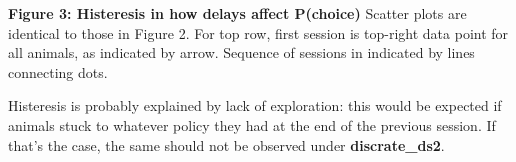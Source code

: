 \documentclass[11pt]{article}
\begin{document}
    \textbf{Figure 3: Histeresis in how delays affect P(choice)} Scatter
plots are identical to those in Figure 2. For top row, first session is
top-right data point for all animals, as indicated by arrow. Sequence of
sessions in indicated by lines connecting dots.

    Histeresis is probably explained by lack of exploration: this would be
expected if animals stuck to whatever policy they had at the end of the
previous session. If that's the case, the same should not be observed
under \textbf{discrate\_ds2}.


    
    
    
    
\end{document}
